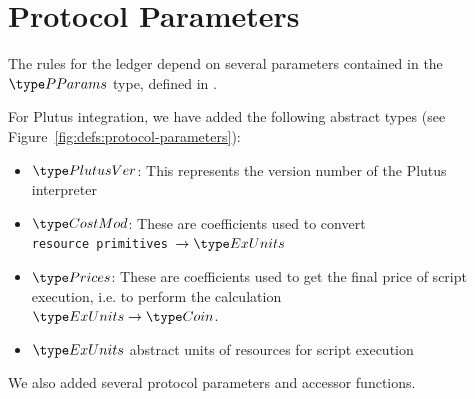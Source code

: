 \section{Protocol Parameters}
\label{sec:protocol-parameters}

The rules for the ledger depend on several parameters contained in the $\PParams$ type,
defined in \cite{byron_ledger_spec}.

For Plutus integration, we have added the following abstract types
(see Figure~\ref{fig:defs:protocol-parameters}):

\begin{itemize}
\item $\PlutusVer$: This represents the version number of the Plutus interpreter
\item $\CostMod$: These are coefficients used to convert \\
\texttt{resource primitives}~$\to \ExUnits$
\item $\Prices$: These are coefficients used to get the final price of script
execution, i.e. to perform the calculation \\
$\ExUnits \to \Coin$.
\item $\ExUnits$ abstract units of resources for script execution
\end{itemize}

We also added several protocol parameters and accessor functions.


